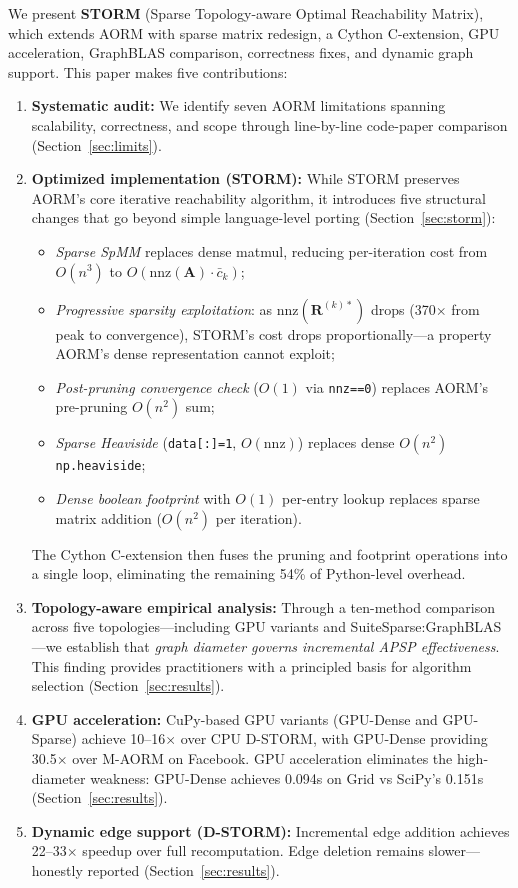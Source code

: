 \documentclass[journal]{IEEEtran}
\begin{document}
We present \textbf{STORM} (Sparse Topology-aware Optimal Reachability Matrix), which extends AORM with sparse matrix redesign, a Cython C-extension, GPU acceleration, GraphBLAS comparison, correctness fixes, and dynamic graph support. This paper makes five contributions:

\begin{enumerate}
  \item \textbf{Systematic audit:} We identify seven AORM limitations spanning scalability, correctness, and scope through line-by-line code-paper comparison (Section~\ref{sec:limits}).

  \item \textbf{Optimized implementation (STORM):} While STORM preserves AORM's core iterative reachability algorithm, it introduces five structural changes that go beyond simple language-level porting (Section~\ref{sec:storm}):
  \begin{itemize}
    \item \emph{Sparse SpMM} replaces dense matmul, reducing per-iteration cost from $O(n^3)$ to $O(\text{nnz}(\mathbf{A}) \cdot \bar{c}_k)$;
    \item \emph{Progressive sparsity exploitation}: as $\text{nnz}(\mathbf{R}^{(k)*})$ drops (370$\times$ from peak to convergence), STORM's cost drops proportionally---a property AORM's dense representation cannot exploit;
    \item \emph{Post-pruning convergence check} ($O(1)$ via \texttt{nnz==0}) replaces AORM's pre-pruning $O(n^2)$ sum;
    \item \emph{Sparse Heaviside} (\texttt{data[:]=1}, $O(\text{nnz})$) replaces dense $O(n^2)$ \texttt{np.heaviside};
    \item \emph{Dense boolean footprint} with $O(1)$ per-entry lookup replaces sparse matrix addition ($O(n^2)$ per iteration).
  \end{itemize}
  The Cython C-extension then fuses the pruning and footprint operations into a single loop, eliminating the remaining 54\% of Python-level overhead.

  \item \textbf{Topology-aware empirical analysis:} Through a ten-method comparison across five topologies---including GPU variants and SuiteSparse:GraphBLAS---we establish that \emph{graph diameter governs incremental APSP effectiveness}. This finding provides practitioners with a principled basis for algorithm selection (Section~\ref{sec:results}).

  \item \textbf{GPU acceleration:} CuPy-based GPU variants (GPU-Dense and GPU-Sparse) achieve 10--16$\times$ over CPU D-STORM, with GPU-Dense providing 30.5$\times$ over M-AORM on Facebook. GPU acceleration eliminates the high-diameter weakness: GPU-Dense achieves 0.094s on Grid vs SciPy's 0.151s (Section~\ref{sec:results}).

  \item \textbf{Dynamic edge support (D-STORM):} Incremental edge addition achieves 22--33$\times$ speedup over full recomputation. Edge deletion remains slower---honestly reported (Section~\ref{sec:results}).
\end{enumerate}
\end{document}
